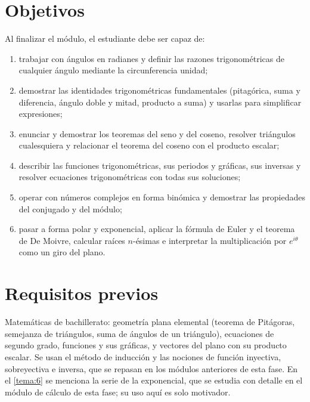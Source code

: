 \documentclass[11pt,a4paper,twoside,openany]{book}
\begin{document}
\section*{Objetivos}
Al finalizar el módulo, el estudiante debe ser capaz de:
\begin{enumerate}[label=\arabic*.]
  \item trabajar con ángulos en radianes y definir las razones trigonométricas de cualquier ángulo mediante la circunferencia unidad;
  \item demostrar las identidades trigonométricas fundamentales (pitagórica, suma y diferencia, ángulo doble y mitad, producto a suma) y usarlas para simplificar expresiones;
  \item enunciar y demostrar los teoremas del seno y del coseno, resolver triángulos cualesquiera y relacionar el teorema del coseno con el producto escalar;
  \item describir las funciones trigonométricas, sus periodos y gráficas, sus inversas y resolver ecuaciones trigonométricas con todas sus soluciones;
  \item operar con números complejos en forma binómica y demostrar las propiedades del conjugado y del módulo;
  \item pasar a forma polar y exponencial, aplicar la fórmula de Euler y el teorema de De Moivre, calcular raíces $n$-ésimas e interpretar la multiplicación por $e^{i\theta}$ como un giro del plano.
\end{enumerate}

\section*{Requisitos previos}
Matemáticas de bachillerato: geometría plana elemental (teorema de Pitágoras, semejanza de triángulos, suma de ángulos de un triángulo), ecuaciones de segundo grado, funciones y sus gráficas, y vectores del plano con su producto escalar. Se usan el método de inducción y las nociones de función inyectiva, sobreyectiva e inversa, que se repasan en los módulos anteriores de esta fase. En el \cref{tema:6} se menciona la serie de la exponencial, que se estudia con detalle en el módulo de cálculo de esta fase; su uso aquí es solo motivador.
\end{document}
